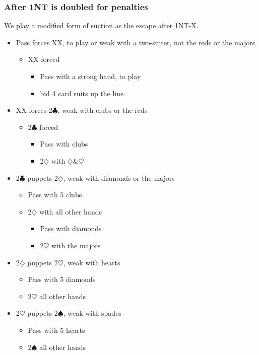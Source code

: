 \documentclass[a4paper,14pt]{extarticle}
\begin{document}
\newpage

\subsubsection{After 1NT is doubled for penalties}
\label{sec:resp:1nx}

We play a modified form of suction as the escape after 1NT-X.

\begin{itemize}
\item Pass forces XX, to play or weak with a two-suiter, not the reds or the majors
	\begin{itemize}
	\item XX forced
		\begin{itemize}
		\item Pass with a strong hand, to play
		\item bid 4 card suits up the line
		\end{itemize}
	\end{itemize}
\item XX forces 2$\clubsuit$, weak with clubs or the reds
	\begin{itemize}
	\item 2$\clubsuit$ forced
		\begin{itemize}
		\item Pass with clubs
		\item 2$\diamondsuit$ with $\diamondsuit$\&$\heartsuit$
		\end{itemize}
	\end{itemize}
\item 2$\clubsuit$ puppets 2$\diamondsuit$, weak with diamonds or the majors
	\begin{itemize}
	\item Pass with 5 clubs
	\item 2$\diamondsuit$ with all other hands
		\begin{itemize}
		\item Pass with diamonds
		\item 2$\heartsuit$ with the majors
		\end{itemize}
	\end{itemize}
\item 2$\diamondsuit$ puppets 2$\heartsuit$, weak with hearts
	\begin{itemize}
	\item Pass with 5 diamonds
	\item 2$\heartsuit$ all other hands
	\end{itemize}
\item 2$\heartsuit$ puppets 2$\spadesuit$, weak with spades
	\begin{itemize}
	\item Pass with 5 hearts
	\item 2$\spadesuit$ all other hands
	\end{itemize}
\end{itemize}
\end{document}
